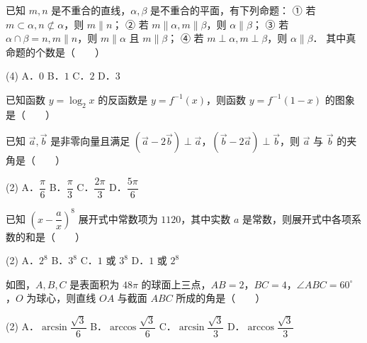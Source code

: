 \begin{question}
已知 $m, n$ 是不重合的直线，$\alpha, \beta$ 是不重合的平面，有下列命题：
① 若 $m \subset \alpha, n \not\subset \alpha$，则 $m \parallel n$；
② 若 $m \parallel \alpha, m \parallel \beta$，则 $\alpha \parallel \beta$；
③ 若 $\alpha \cap \beta = n, m \parallel n$，则 $m \parallel \alpha$ 且 $m \parallel \beta$；
④ 若 $m \perp \alpha, m \perp \beta$，则 $\alpha \parallel \beta$．
其中真命题的个数是\mbox{（　　）}

\begin{gkopts}(4)
\task A．$0$
\task B．$1$
\task C．$2$
\task D．$3$
\end{gkopts}

\Needspace{0.4\textheight}
\end{question}
\begin{question}
已知函数 $y = \log_2 x$ 的反函数是 $y = f^{-1}(x)$，则函数 $y = f^{-1}(1 - x)$ 的图象是\mbox{（　　）}
\nopagebreak[4]
\begin{center}\end{center}
\nopagebreak[4]
\end{question}
\begin{question}
已知 $\vec{a}, \vec{b}$ 是非零向量且满足 $(\vec{a} - 2\vec{b}) \perp \vec{a}$，$(\vec{b} - 2\vec{a}) \perp \vec{b}$，则 $\vec{a}$ 与 $\vec{b}$ 的夹角是\mbox{（　　）}

\begin{gkopts}(2)
\task A．$\dfrac{\pi}{6}$
\task B．$\dfrac{\pi}{3}$
\task C．$\dfrac{2\pi}{3}$
\task D．$\dfrac{5\pi}{6}$
\end{gkopts}

\end{question}
\begin{question}
已知 $\left(x - \dfrac{a}{x}\right)^8$ 展开式中常数项为 $1120$，其中实数 $a$ 是常数，则展开式中各项系数的和是\mbox{（　　）}

\begin{gkopts}(2)
\task A．$2^8$
\task B．$3^8$
\task C．$1$ 或 $3^8$
\task D．$1$ 或 $2^8$
\end{gkopts}

\Needspace{0.4\textheight}
\end{question}
\begin{question}
如图，$A, B, C$ 是表面积为 $48\pi$ 的球面上三点，$AB = 2$，$BC = 4$，$\angle ABC = 60^\circ$，$O$ 为球心，则直线 $OA$ 与截面 $ABC$ 所成的角是\mbox{（　　）}

\begin{gkopts}(2)
\task A．$\arcsin\dfrac{\sqrt{3}}{6}$
\task B．$\arccos\dfrac{\sqrt{3}}{6}$
\task C．$\arcsin\dfrac{\sqrt{3}}{3}$
\task D．$\arccos\dfrac{\sqrt{3}}{3}$
\end{gkopts}
\nopagebreak[4]
\begin{center}\end{center}
\nopagebreak[4]
\end{question}
